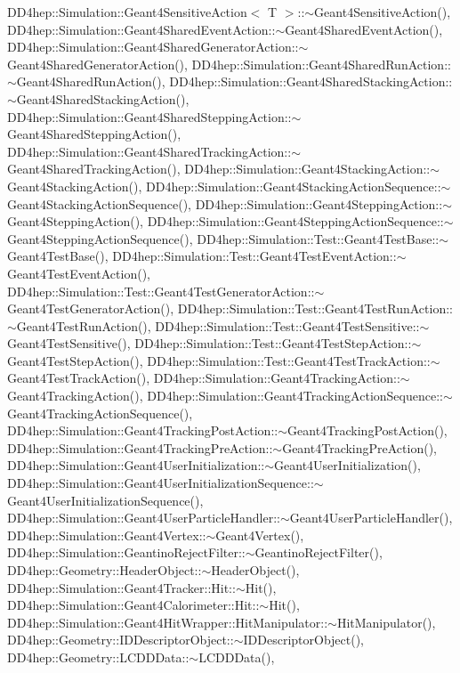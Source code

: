 D\+D4hep\+::\+Simulation\+::\+Geant4\+Sensitive\+Action$<$ T $>$\+::$\sim$\+Geant4\+Sensitive\+Action(), D\+D4hep\+::\+Simulation\+::\+Geant4\+Shared\+Event\+Action\+::$\sim$\+Geant4\+Shared\+Event\+Action(), D\+D4hep\+::\+Simulation\+::\+Geant4\+Shared\+Generator\+Action\+::$\sim$\+Geant4\+Shared\+Generator\+Action(), D\+D4hep\+::\+Simulation\+::\+Geant4\+Shared\+Run\+Action\+::$\sim$\+Geant4\+Shared\+Run\+Action(), D\+D4hep\+::\+Simulation\+::\+Geant4\+Shared\+Stacking\+Action\+::$\sim$\+Geant4\+Shared\+Stacking\+Action(), D\+D4hep\+::\+Simulation\+::\+Geant4\+Shared\+Stepping\+Action\+::$\sim$\+Geant4\+Shared\+Stepping\+Action(), D\+D4hep\+::\+Simulation\+::\+Geant4\+Shared\+Tracking\+Action\+::$\sim$\+Geant4\+Shared\+Tracking\+Action(), D\+D4hep\+::\+Simulation\+::\+Geant4\+Stacking\+Action\+::$\sim$\+Geant4\+Stacking\+Action(), D\+D4hep\+::\+Simulation\+::\+Geant4\+Stacking\+Action\+Sequence\+::$\sim$\+Geant4\+Stacking\+Action\+Sequence(), D\+D4hep\+::\+Simulation\+::\+Geant4\+Stepping\+Action\+::$\sim$\+Geant4\+Stepping\+Action(), D\+D4hep\+::\+Simulation\+::\+Geant4\+Stepping\+Action\+Sequence\+::$\sim$\+Geant4\+Stepping\+Action\+Sequence(), D\+D4hep\+::\+Simulation\+::\+Test\+::\+Geant4\+Test\+Base\+::$\sim$\+Geant4\+Test\+Base(), D\+D4hep\+::\+Simulation\+::\+Test\+::\+Geant4\+Test\+Event\+Action\+::$\sim$\+Geant4\+Test\+Event\+Action(), D\+D4hep\+::\+Simulation\+::\+Test\+::\+Geant4\+Test\+Generator\+Action\+::$\sim$\+Geant4\+Test\+Generator\+Action(), D\+D4hep\+::\+Simulation\+::\+Test\+::\+Geant4\+Test\+Run\+Action\+::$\sim$\+Geant4\+Test\+Run\+Action(), D\+D4hep\+::\+Simulation\+::\+Test\+::\+Geant4\+Test\+Sensitive\+::$\sim$\+Geant4\+Test\+Sensitive(), D\+D4hep\+::\+Simulation\+::\+Test\+::\+Geant4\+Test\+Step\+Action\+::$\sim$\+Geant4\+Test\+Step\+Action(), D\+D4hep\+::\+Simulation\+::\+Test\+::\+Geant4\+Test\+Track\+Action\+::$\sim$\+Geant4\+Test\+Track\+Action(), D\+D4hep\+::\+Simulation\+::\+Geant4\+Tracking\+Action\+::$\sim$\+Geant4\+Tracking\+Action(), D\+D4hep\+::\+Simulation\+::\+Geant4\+Tracking\+Action\+Sequence\+::$\sim$\+Geant4\+Tracking\+Action\+Sequence(), D\+D4hep\+::\+Simulation\+::\+Geant4\+Tracking\+Post\+Action\+::$\sim$\+Geant4\+Tracking\+Post\+Action(), D\+D4hep\+::\+Simulation\+::\+Geant4\+Tracking\+Pre\+Action\+::$\sim$\+Geant4\+Tracking\+Pre\+Action(), D\+D4hep\+::\+Simulation\+::\+Geant4\+User\+Initialization\+::$\sim$\+Geant4\+User\+Initialization(), D\+D4hep\+::\+Simulation\+::\+Geant4\+User\+Initialization\+Sequence\+::$\sim$\+Geant4\+User\+Initialization\+Sequence(), D\+D4hep\+::\+Simulation\+::\+Geant4\+User\+Particle\+Handler\+::$\sim$\+Geant4\+User\+Particle\+Handler(), D\+D4hep\+::\+Simulation\+::\+Geant4\+Vertex\+::$\sim$\+Geant4\+Vertex(), D\+D4hep\+::\+Simulation\+::\+Geantino\+Reject\+Filter\+::$\sim$\+Geantino\+Reject\+Filter(), D\+D4hep\+::\+Geometry\+::\+Header\+Object\+::$\sim$\+Header\+Object(), D\+D4hep\+::\+Simulation\+::\+Geant4\+Tracker\+::\+Hit\+::$\sim$\+Hit(), D\+D4hep\+::\+Simulation\+::\+Geant4\+Calorimeter\+::\+Hit\+::$\sim$\+Hit(), D\+D4hep\+::\+Simulation\+::\+Geant4\+Hit\+Wrapper\+::\+Hit\+Manipulator\+::$\sim$\+Hit\+Manipulator(), D\+D4hep\+::\+Geometry\+::\+I\+D\+Descriptor\+Object\+::$\sim$\+I\+D\+Descriptor\+Object(), D\+D4hep\+::\+Geometry\+::\+L\+C\+D\+D\+Data\+::$\sim$\+L\+C\+D\+D\+Data(), 
